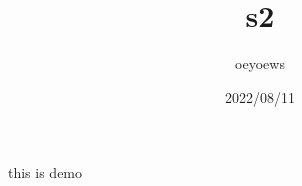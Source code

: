 \documentclass{slides}
\title{s2}
\author{oeyoews}
\date{2022/08/11}
\begin{document}
\maketitle

this is demo
\end{document}
